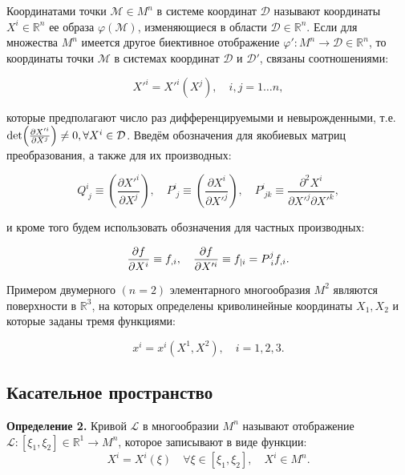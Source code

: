 \documentclass[14pt,a4paper]{scrartcl}
\begin{document}
Координатами точки $\mathcal{M} \in M^n$ в системе координат $\mathcal{D}$ называют координаты $X^i \in \mathbb{R}^n$ ее образа $\varphi(\mathcal{M})$, изменяющиеся в области $\mathcal{D} \in \mathbb{R}^n$.
Если для множества $M^n$ имеется другое биективное отображение $\varphi': M^n \longrightarrow \mathcal{D} \in \mathbb{R}^n$, то координаты точки $\mathcal{M}$ в системах координат $\mathcal{D}$ и $\mathcal{D'}$, связаны соотношениями:

\begin{equation}\label{e1}
	X'^i = X'^i(X^j), \quad i,j=1\dots n,
\end{equation}

которые предполагают число раз дифференцируемыми и невырожденными, т.е. $\det (\pdv{X'^i}{X^j}) \neq 0, \forall X^i \in \mathcal{D}$.
Введём обозначения для якобиевых матриц преобразования, а также для их производных:

\begin{equation}\label{eq2}
	Q_{\; j}^{i} \equiv\left(\frac{\partial X'^{i}}{\partial X^{j}}\right), \quad P_{\; j}^{i} \equiv\left(\frac{\partial X^{i}}{\partial X'^{j}}\right), \quad P_{\; j k}^{i} \equiv \frac{\partial^{2} X^{i}}{\partial X'^{j} \partial X'^{k}},
\end{equation}

и кроме того будем использовать обозначения для частных производных:

\begin{equation}\label{eq3}
	\pdv{f}{X^i} \equiv f_{,i}, \quad \pdv{f}{X'^i} \equiv f_{|i} = P_{\; i}^j f_{,i}.
\end{equation}

Примером двумерного $(n = 2)$ элементарного многообразия $M^2$ являются поверхности в $\mathbb{R}^3$, на которых определены криволинейные координаты $X_1, X_2$ и которые заданы тремя функциями:

\begin{equation}\label{eq4}
	x^i = x^{i}(X^1, X^2), \quad i=1,2,3.
\end{equation}

\subsection{Касательное пространство}
\textbf{Определение 2.} Кривой $\mathcal{L}$ в многообразии $M^n$ называют отображение $\mathcal{L}: [\xi_1,\xi_2] \in \mathbb{R}^1 \longrightarrow M^n$, которое записывают в виде функции:
\begin{equation}\label{eq5}
	X^i = X^i(\xi) \quad \forall \xi \in [\xi_1, \xi_2], \quad X^i \in M^n.	
\end{equation}
\end{document}
